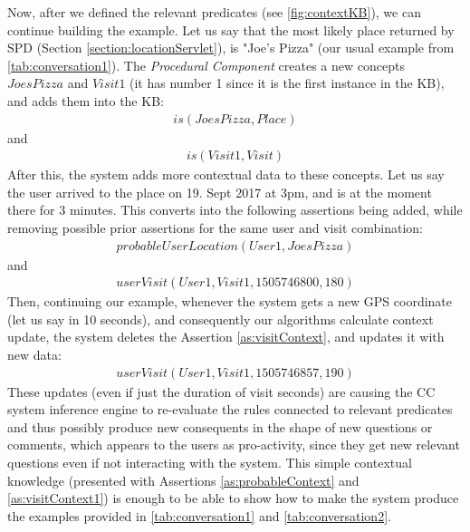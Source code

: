 Now, after we defined the relevant predicates (see \autoref{fig:contextKB}), we 
can continue building the example.
Let us say that the most likely place returned by SPD
(Section \ref{section:locationServlet}), is "Joe's Pizza"
(our usual example from \autoref{tab:conversation1}). The 
\emph{Procedural Component} creates a new concepts  $JoesPizza$ and 
$Visit1$ (it has number 1 since it is the first instance in the KB), and adds 
them into the KB:
\begin{equation}\label{as:joesPizza}
\begin{gathered}
	is(JoesPizza,Place)
\end{gathered}
\end{equation}
and
\begin{equation}\label{as:visit1}
\begin{gathered}
	is(Visit1,Visit)
\end{gathered}
\end{equation}
After this, the system adds more contextual data to these concepts. Let us say
the user arrived to the place on 19. Sept 2017 at 3pm, and is at the moment
there for 3 minutes. This converts into the following assertions being added, 
while removing possible prior assertions for the same user and visit 
combination:
\begin{equation}\label{as:probableContext}
\begin{gathered}
	probableUserLocation(User1,JoesPizza)
\end{gathered}
\end{equation}
and
\begin{equation}\label{as:visitContext}
\begin{gathered}
	userVisit(User1,Visit1,1505746800,180)
\end{gathered}
\end{equation}
Then, continuing our example, whenever the system gets a new GPS coordinate
(let us say in 10 seconds), and consequently our algorithms calculate context 
update, the system deletes the Assertion \ref{as:visitContext}, and updates it
with new data:
\begin{equation}\label{as:visitContext1}
\begin{gathered}
	userVisit(User1,Visit1,1505746857,190)
\end{gathered}
\end{equation}
These updates (even if just the duration of visit seconds) are causing the CC 
system inference engine to re-evaluate the rules connected to relevant 
predicates and thus possibly produce new consequents in the shape of new 
questions or comments, which appears to the users as pro-activity, since they 
get new relevant questions even if not interacting with the system.
This simple contextual knowledge (presented with Assertions 
\ref{as:probableContext} and \ref{as:visitContext1}) is enough to be able to 
show how to make the system produce the examples provided in 
\autoref{tab:conversation1} and \autoref{tab:conversation2}.

